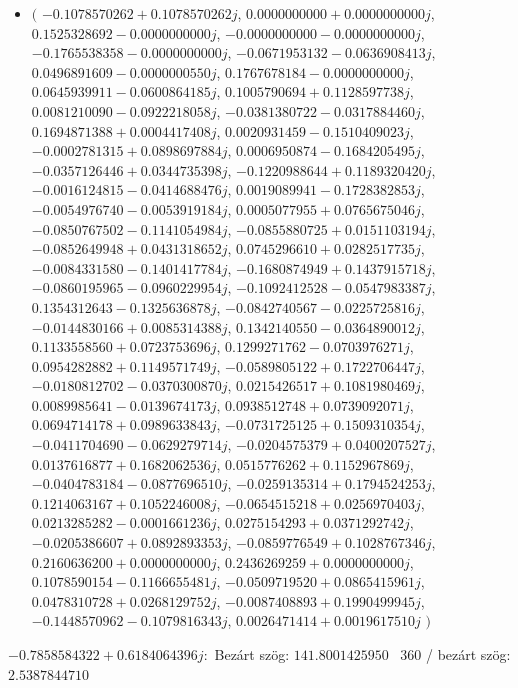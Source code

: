 \documentclass[14pt,a4paper]{article}
\begin{document}
\begin{itemize}
\item
$\big($
$-0.1078570262+0.1078570262j$, $0.0000000000+0.0000000000j$, $0.1525328692-0.0000000000j$, $-0.0000000000-0.0000000000j$, $-0.1765538358-0.0000000000j$, $-0.0671953132-0.0636908413j$, $0.0496891609-0.0000000550j$, $0.1767678184-0.0000000000j$, $0.0645939911-0.0600864185j$, $0.1005790694+0.1128597738j$, $0.0081210090-0.0922218058j$, $-0.0381380722-0.0317884460j$, $0.1694871388+0.0004417408j$, $0.0020931459-0.1510409023j$, $-0.0002781315+0.0898697884j$, $0.0006950874-0.1684205495j$, $-0.0357126446+0.0344735398j$, $-0.1220988644+0.1189320420j$, $-0.0016124815-0.0414688476j$, $0.0019089941-0.1728382853j$, $-0.0054976740-0.0053919184j$, $0.0005077955+0.0765675046j$, $-0.0850767502-0.1141054984j$, $-0.0855880725+0.0151103194j$, $-0.0852649948+0.0431318652j$, $0.0745296610+0.0282517735j$, $-0.0084331580-0.1401417784j$, $-0.1680874949+0.1437915718j$, $-0.0860195965-0.0960229954j$, $-0.1092412528-0.0547983387j$, $0.1354312643-0.1325636878j$, $-0.0842740567-0.0225725816j$, $-0.0144830166+0.0085314388j$, $0.1342140550-0.0364890012j$, $0.1133558560+0.0723753696j$, $0.1299271762-0.0703976271j$, $0.0954282882+0.1149571749j$, $-0.0589805122+0.1722706447j$, $-0.0180812702-0.0370300870j$, $0.0215426517+0.1081980469j$, $0.0089985641-0.0139674173j$, $0.0938512748+0.0739092071j$, $0.0694714178+0.0989633843j$, $-0.0731725125+0.1509310354j$, $-0.0411704690-0.0629279714j$, $-0.0204575379+0.0400207527j$, $0.0137616877+0.1682062536j$, $0.0515776262+0.1152967869j$, $-0.0404783184-0.0877696510j$, $-0.0259135314+0.1794524253j$, $0.1214063167+0.1052246008j$, $-0.0654515218+0.0256970403j$, $0.0213285282-0.0001661236j$, $0.0275154293+0.0371292742j$, $-0.0205386607+0.0892893353j$, $-0.0859776549+0.1028767346j$, $0.2160636200+0.0000000000j$, $0.2436269259+0.0000000000j$, $0.1078590154-0.1166655481j$, $-0.0509719520+0.0865415961j$, $0.0478310728+0.0268129752j$, $-0.0087408893+0.1990499945j$, $-0.1448570962-0.1079816343j$, $0.0026471414+0.0019617510j$
$\big)$
\end{itemize}
$-0.7858584322+0.6184064396j$:\
Bezárt szög: $141.8001425950$ \
360 / bezárt szög: $2.5387844710$\
\end{document}
